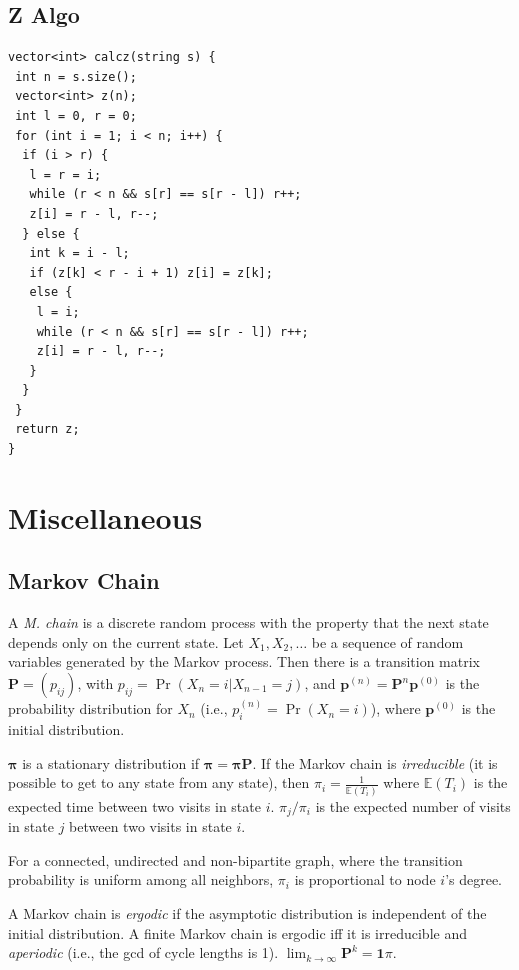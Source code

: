 \documentclass[a4paper,11pt,oneside]{article}
\begin{document}
\begin{multicols*}{\COLS}
\subsection{Z Algo}
\begin{lstlisting}
vector<int> calcz(string s) {
 int n = s.size();
 vector<int> z(n);
 int l = 0, r = 0;
 for (int i = 1; i < n; i++) {
  if (i > r) {
   l = r = i;
   while (r < n && s[r] == s[r - l]) r++;
   z[i] = r - l, r--;
  } else {
   int k = i - l;
   if (z[k] < r - i + 1) z[i] = z[k];
   else {
    l = i;
    while (r < n && s[r] == s[r - l]) r++;
    z[i] = r - l, r--;
   }
  }
 }
 return z;
}
\end{lstlisting}
\section{\small Miscellaneous}
\subsection{\small Markov Chain}
A \emph{M. chain} is a discrete random process with the property that the next state depends only on the current state. Let $X_1,X_2,\ldots$ be a sequence of random variables generated by the Markov process. Then there is a transition matrix $\mathbf{P} = (p_{ij})$, with $p_{ij} = \Pr(X_n = i | X_{n-1} = j)$, and $\mathbf{p}^{(n)} = \mathbf P^n \mathbf p^{(0)}$ is the probability distribution for $X_n$ (i.e., $p^{(n)}_i = \Pr(X_n = i)$), where $\mathbf{p}^{(0)}$ is the initial distribution.

$\mathbf{\pi}$ is a stationary distribution if $\mathbf{\pi} = \mathbf{\pi P}$. If the Markov chain is \emph{irreducible} (it is possible to get to any state from any state), then $\pi_i = \frac{1}{\mathbb{E}(T_i)}$ where $\mathbb{E}(T_i)$  is the expected time between two visits in state $i$. $\pi_j/\pi_i$ is the expected number of visits in state $j$ between two visits in state $i$.

For a connected, undirected and non-bipartite graph, where the transition probability is uniform among all neighbors, $\pi_i$ is proportional to node $i$'s degree.

A Markov chain is \emph{ergodic} if the asymptotic distribution is independent of the initial distribution. A finite Markov chain is ergodic iff it is irreducible and \emph{aperiodic} (i.e., the gcd of cycle lengths is 1). $\lim_{k\rightarrow\infty}\mathbf{P}^k = \mathbf{1}\pi$.


\end{multicols*}
\end{document}
